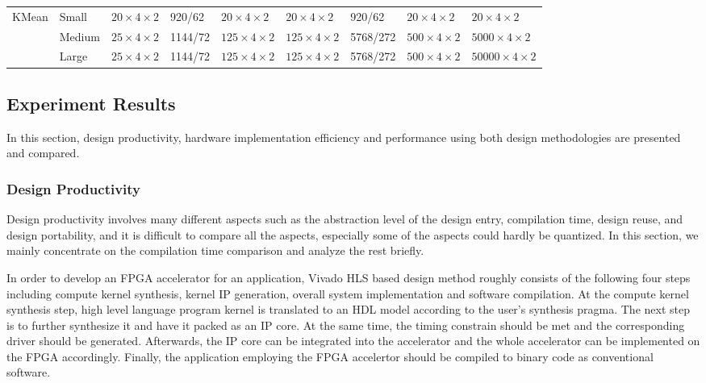 \begin{table*}[t]
\begin{tabular}{|l|l|l|l|l|l|l|l|l|}
\multirow{3}{*}{KMean} & Small & $20 \times 4 \times 2$ & 920/62 & $20 \times 4 \times 2$ & $20 \times 4 \times 2$ & 920/62 & $20 \times 4 \times 2$ & $20 \times 4 \times 2$ \\ \cline{2-9} 
                 & Medium & $25 \times 4 \times 2$ & 1144/72 & $125 \times 4 \times 2$ & $125 \times 4 \times 2$ & 5768/272 & $500 \times 4 \times 2$ & $5000 \times 4 \times 2$ \\ \cline{2-9} 
                 & Large & $25 \times 4 \times 2$ & 1144/72 & $125 \times 4 \times 2$ & $125 \times 4 \times 2$ & 5768/272 & $500 \times 4 \times 2$ & $50000 \times 4 \times 2$  \\ \hline
\end{tabular}
\end{table*}

\subsection{Experiment Results}
In this section, design productivity, hardware implementation efficiency and performance using both design methodologies are presented and compared. 

\subsubsection{Design Productivity}
Design productivity involves many different aspects such as the abstraction level of the design entry, compilation time, design reuse, and design portability, and it is difficult to compare all the aspects, especially some of the aspects could hardly be quantized. In this section, we mainly concentrate on the compilation time comparison and analyze the rest briefly.

In order to develop an FPGA accelerator for an application, Vivado HLS based design method roughly consists of the following four steps including compute kernel synthesis, kernel IP generation, overall system implementation and software compilation. At the compute kernel synthesis step, high level language program kernel is translated to an HDL model according to the user's synthesis pragma. The next step is to further synthesize it and have it packed as an IP core. At the same time, the timing constrain should be met and the corresponding driver should be generated. Afterwards, the IP core can be integrated into the accelerator and the whole accelerator can be implemented on the FPGA accordingly. Finally, the application employing the FPGA accelertor should be compiled to binary code as conventional software.


